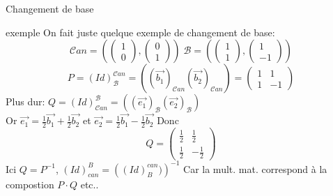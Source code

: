 \begin{parag}{Changement de base}
        \begin{subparag}{exemple}
                On fait juste quelque exemple de changement de base:
                \[\mathcal{C}an = \left(\begin{pmatrix}
                    1 \\ 0
                \end{pmatrix}, \begin{pmatrix}
                    0 \\ 1
                \end{pmatrix} \right) \; \mathcal{B} = \left( \begin{pmatrix}
                    1 \\ 1
                \end{pmatrix}, \begin{pmatrix}
                    1 \\ -1
                \end{pmatrix} \right)\]
        \[P = \left(Id\right)_{\mathcal{B}}^{\mathcal{C}an} = \left(\left(\vec{b_1}\right)_{\mathcal{C}an} \left(\vec{b_2}\right)_{\mathcal{C}an}\right) = \begin{pmatrix}
            1 & 1 \\ 1 & -1
        \end{pmatrix}\]
        Plus dur: $Q = \left(Id\right)_{\mathcal{C}an}^\mathcal{B} =  \left(\left(\vec{e_1}\right)_{\mathcal{B}} \left(\vec{e_2}\right)_{\mathcal{B}}\right)$ 
        \\
        Or $\vec{e_1} = \frac{1}{2}\vec{b_1} + \frac{1}{2}\vec{b_2}$ et $\vec{e_2} = \frac{1}{2}\vec{b_1} - \frac{1}{2}\vec{b_2}$
        Donc 
        \[Q = \begin{pmatrix}
            \frac{1}{2} & \frac{1}{2} \\ \frac{1}{2} & -\frac{1}{2}
        \end{pmatrix}\]
        Ici $Q = P^{-1}$, $(Id)_{can}^{B} = \left( (Id)_B^{can})\right)^{-1}$
        Car la mult. mat. correspond à la compostion $P \cdot Q$ etc..
        \end{subparag}
        
\end{parag}
